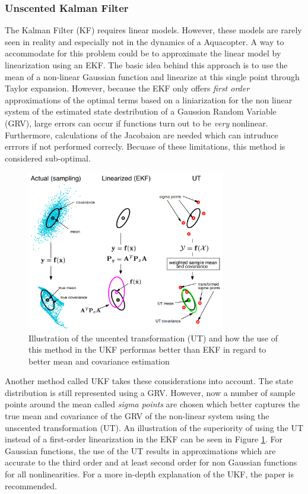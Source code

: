 \documentclass[../Head/report.tex]{subfiles}
\begin{document}
\subsubsection{Unscented Kalman Filter}
\label{sec:ukf}

The Kalman Filter (KF) requires linear models. However, these models are rarely seen in reality and especially not in the dynamics of a Aquacopter. A way to accommodate for this problem could be to approximate the linear model by linearization using an EKF. The basic idea behind this approach is to use the mean of a non-linear Gaussian function and linearize at this single point through Taylor expansion. However, because the EKF only offers \textit{first order} approximations of the optimal terms based on a liniarization for the non linear system of the estimated state destribution of a Gaussion Random Variable (GRV), large errors can occur if functions turn out to be \textit{very} nonlinear. Furthermore, calculations of the Jacobaion are needed which can intruduce errrors if not performed correcly. Becuase of these limitations, this method is considered sub-optimal.  

\begin{figure}[H]
	\centering
	\includegraphics[height=7.0cm]{../Figures/ukf.png}
	\caption{Illustration of the uncented transformation (UT) and how the use of this method in the UKF performas better than EKF in regard to better mean and covariance estimation \cite{UnscentedKalmanFilter}} \label{fig:ut}
\end{figure}

Another method called UKF takes these considerations into account. The state distribution is still represented using a GRV. However, now a number of sample points around the mean called \textit{sigma points} are chosen which better captures the true mean and covariance of the GRV of the non-linear system using the unscented transformation (UT). An illustration of the superiority of using the UT instead of a first-order linearization in the EKF can be seen in Figure \ref{fig:ut}. For Gaussian functions, the use of the UT results in approximations which are accurate to the third order and at least second order for non Gaussian functions for all nonlinearities. For a more in-depth explanation of the UKF, the paper \cite{UnscentedKalmanFilter} is recommended.  
\end{document}

